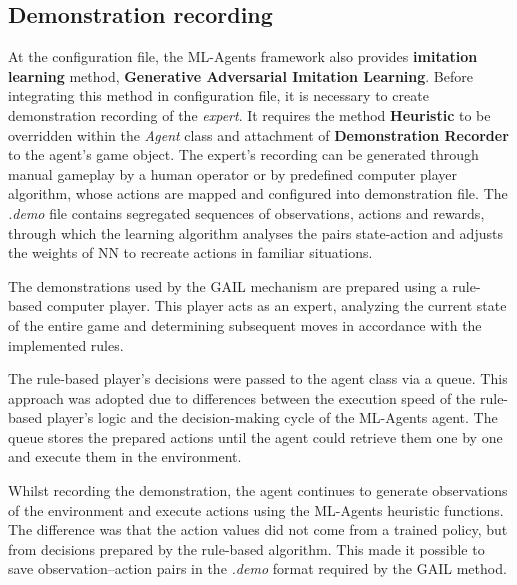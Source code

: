 \subsection{Demonstration recording}
At the configuration file, the ML-Agents framework also provides \textbf{imitation learning} method, \textbf{Generative Adversarial Imitation Learning}. Before integrating this method in configuration file, it is necessary to create demonstration recording of the \textit{expert}. It requires the method \textbf{Heuristic} to be overridden within the \textit{Agent} class and attachment of \textbf{Demonstration Recorder} to the agent's game object. The expert's recording can be generated through manual gameplay by a human operator or by predefined computer player algorithm, whose actions are mapped and configured into demonstration file. The \textit{.demo} file contains segregated sequences of observations, actions and rewards, through which the learning algorithm analyses the pairs state-action and adjusts the weights of NN to recreate actions in familiar situations. 

The demonstrations used by the GAIL mechanism are prepared using a rule-based computer player. This player acts as an expert, analyzing the current state of the entire game and determining subsequent moves in accordance with the implemented rules.

The rule-based player’s decisions were passed to the agent class via a queue. This approach was adopted due to differences between the execution speed of the rule-based player’s logic and the decision-making cycle of the ML-Agents agent. The queue stores the prepared actions until the agent could retrieve them one by one and execute them in the environment.

Whilst recording the demonstration, the agent continues to generate observations of the environment and execute actions using the ML-Agents heuristic functions. The difference was that the action values did not come from a trained policy, but from decisions prepared by the rule-based algorithm. This made it possible to save observation–action pairs in the \textit{.demo} format required by the GAIL method.


